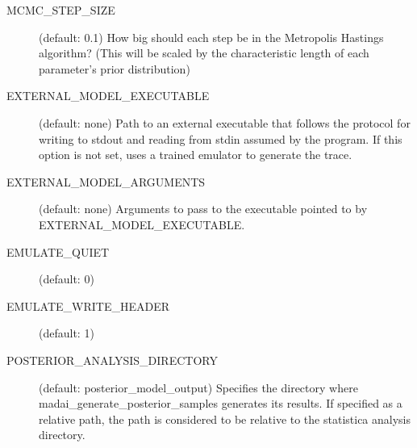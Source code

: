 \begin{description}
    \item[MCMC\_STEP\_SIZE] (default: 0.1) How big should each step be in the Metropolis Hastings algorithm? (This will be scaled by the characteristic length of each parameter's prior distribution)
    \item[EXTERNAL\_MODEL\_EXECUTABLE] (default: none) Path to an external executable that follows the protocol for writing to stdout and reading from stdin assumed by the  program. If this option is not set,  uses a trained emulator to generate the trace.
    \item[EXTERNAL\_MODEL\_ARGUMENTS] (default: none) Arguments to pass to the executable pointed to by EXTERNAL\_MODEL\_EXECUTABLE.
    \item[EMULATE\_QUIET] (default: 0)
    \item[EMULATE\_WRITE\_HEADER] (default: 1)
    \item[POSTERIOR_ANALYSIS_DIRECTORY] (default: posterior_model_output) Specifies the directory where madai_generate_posterior_samples generates its results. If specified as a relative path, the path is considered to be relative to the statistica analysis directory.
\end{description}

